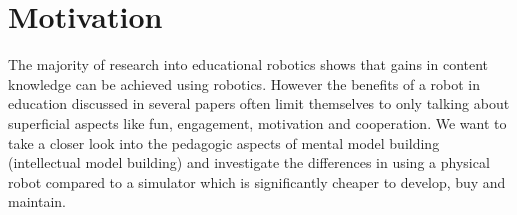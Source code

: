 \section{Motivation}
The majority of research into educational robotics shows that gains in content knowledge can be achieved using robotics. 
However the benefits of a robot in education discussed in several papers often limit themselves to only talking about superficial aspects like fun, engagement, motivation and cooperation. 
We want to take a closer look into the pedagogic aspects of mental model building (intellectual model building) and investigate the differences in using a physical robot compared to a simulator which is significantly cheaper to develop, buy and maintain.%


